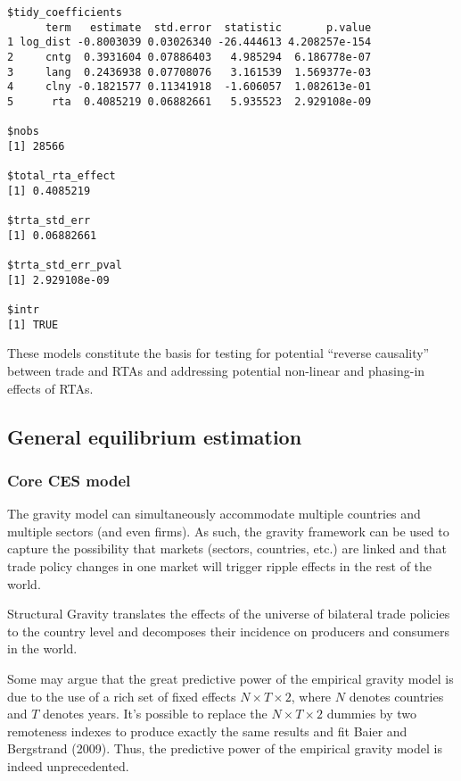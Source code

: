 \documentclass[12pt,reqno,oneside,pdftex]{formato-puc/puctesis} %
\begin{document}
\begin{verbatim}
$tidy_coefficients
      term   estimate  std.error  statistic       p.value
1 log_dist -0.8003039 0.03026340 -26.444613 4.208257e-154
2     cntg  0.3931604 0.07886403   4.985294  6.186778e-07
3     lang  0.2436938 0.07708076   3.161539  1.569377e-03
4     clny -0.1821577 0.11341918  -1.606057  1.082613e-01
5      rta  0.4085219 0.06882661   5.935523  2.929108e-09

$nobs
[1] 28566

$total_rta_effect
[1] 0.4085219

$trta_std_err
[1] 0.06882661

$trta_std_err_pval
[1] 2.929108e-09

$intr
[1] TRUE
\end{verbatim}

These models constitute the basis for testing for potential ``reverse
causality'' between trade and RTAs and addressing potential non-linear
and phasing-in effects of RTAs.

\hypertarget{general-equilibrium-estimation}{%
\subsection{General equilibrium
estimation}\label{general-equilibrium-estimation}}

\hypertarget{core-ces-model}{%
\subsubsection{Core CES model}\label{core-ces-model}}

The gravity model can simultaneously accommodate multiple countries and
multiple sectors (and even firms). As such, the gravity framework can be
used to capture the possibility that markets (sectors, countries, etc.)
are linked and that trade policy changes in one market will trigger
ripple effects in the rest of the world.

Structural Gravity translates the effects of the universe of bilateral
trade policies to the country level and decomposes their incidence on
producers and consumers in the world.

Some may argue that the great predictive power of the empirical gravity
model is due to the use of a rich set of fixed effects
\(N \times T \times 2\), where \(N\) denotes countries and \(T\) denotes
years. It's possible to replace the \(N \times T \times 2\) dummies by
two remoteness indexes to produce exactly the same results and fit Baier
and Bergstrand (2009). Thus, the predictive power of the empirical
gravity model is indeed unprecedented.
\end{document}
